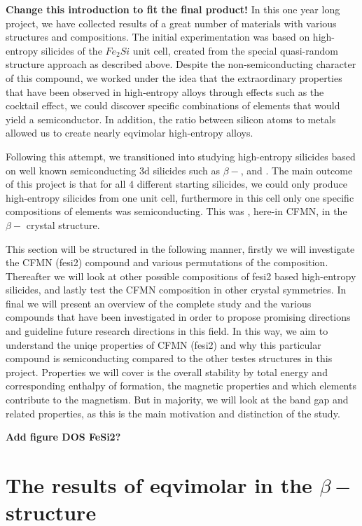 \textbf{Change this introduction to fit the final product!}
In this one year long project, we have collected results of a great number of materials with various structures and compositions. The initial experimentation was based on high-entropy silicides of the $Fe_2Si$ unit cell, created from the special quasi-random structure approach as described above. Despite the non-semiconducting character of this compound, we worked under the idea that the extraordinary properties that have been observed in high-entropy alloys through effects such as the cocktail effect, we could discover specific combinations of elements that would yield a semiconductor. In addition, the ratio between silicon atoms to metals allowed us to create nearly eqvimolar high-entropy alloys. 

Following this attempt, we transitioned into studying high-entropy silicides based on well known semiconducting 3d silicides such as $\beta-$,  and . The main outcome of this project is that for all 4 different starting silicides, we could only produce high-entropy silicides from one unit cell, furthermore in this cell only one specific compositions of elements was semiconducting. This was , here-in CFMN, in the $\beta-$  crystal structure.  

This section will be structured in the following manner, firstly we will investigate the CFMN (fesi2) compound and various permutations of the composition. Thereafter we will look at other possible compositions of fesi2 based high-entropy silicides, and lastly test the CFMN composition in other crystal symmetries. In final we will present an overview of the complete study and the various compounds that have been investigated in order to propose promising directions and guideline future research directions in this field. In this way, we aim to understand the uniqe properties of CFMN (fesi2) and why this particular compound is semiconducting compared to the other testes structures in this project. Properties we will cover is the overall stability by total energy and corresponding enthalpy of formation, the magnetic properties and which elements contribute to the magnetism. But in majority, we will look at the band gap and related properties, as this is the main motivation and distinction of the study.

\textbf{Add figure DOS FeSi2?}


\chapter{The results of eqvimolar  in the $\beta-$ structure}
\label{sec:equi}

